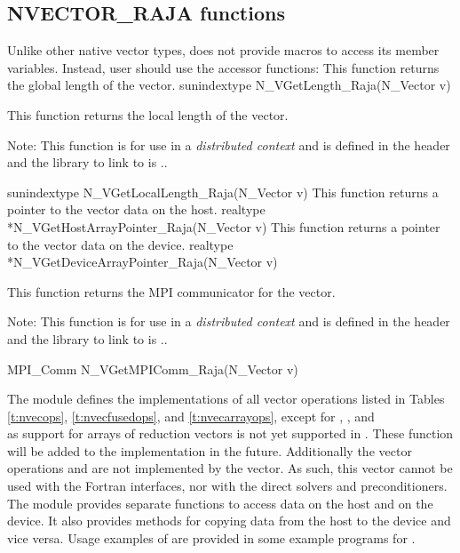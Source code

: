\subsection{NVECTOR\_RAJA functions}
\label{ss:nvec_raja_functions}

Unlike other native {\sundials} vector types, {\nvecraja} does not provide macros
to access its member variables. Instead, user should use the accessor functions:
{
  This function returns the global length of the vector.
}
{
  sunindextype N\_VGetLength\_Raja(N\_Vector v)
}
{
  This function returns the local length of the vector.
    
  Note: This function is for use in a \textit{distributed context} and
  is defined in the header  and the library
  to link to is ..
}
{
  sunindextype N\_VGetLocalLength\_Raja(N\_Vector v)
}
{
  This function returns a pointer to the vector data on the host.
}
{
  realtype *N\_VGetHostArrayPointer\_Raja(N\_Vector v)
}
{
  This function returns a pointer to the vector data on the device.
}
{
  realtype *N\_VGetDeviceArrayPointer\_Raja(N\_Vector v)
}
{
  This function returns the MPI communicator for the vector.
    
  Note: This function is for use in a \textit{distributed context}
  and is defined in the header  and the
  library to link to is ..
}
{
  MPI\_Comm N\_VGetMPIComm\_Raja(N\_Vector v)
}

The {\nvecraja} module defines the implementations of all vector operations listed
in Tables \ref{t:nvecops}, \ref{t:nvecfusedops}, and \ref{t:nvecarrayops}, except
for , , and \\ \noindent
{} as support for arrays of reduction vectors is not
yet supported in {\raja}. These function will be added to the {\nvecraja}
implementation in the future. Additionally the vector operations  and
 are not implemented by the {\raja} vector.
As such, this vector cannot be used with the {\sundials} Fortran interfaces,
nor with the {\sundials} direct solvers and preconditioners.
The {\nvecraja} module provides separate functions to access data on the host
and on the device. It also provides methods for copying data from the host to
the device and vice versa. Usage examples of {\nvecraja} are provided in
some example programs for {\cvode} \cite{cvode_ex}.

